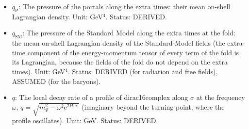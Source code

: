 \documentclass[
  10pt,
]{article}
\begin{document}
\begin{itemize}
  gas). Unit: GeV\(^4\). Status: DERIVED.
\item
  \(q_{\mathrm{P}}\): The pressure of the portals along the extra times:
  their mean on-shell Lagrangian density. Unit: GeV\(^4\). Status:
  DERIVED.
\item
  \(q_{\mathrm{SM}}\): The pressure of the Standard Model along the
  extra times at the fold: the mean on-shell Lagrangian density of the
  Standard-Model fields (the extra-time component of the energy-momentum
  tensor of every term of the fold is its Lagrangian, because the fields
  of the fold do not depend on the extra times). Unit: GeV\(^4\).
  Status: DERIVED (for radiation and free fields), ASSUMED (for the
  baryons).
\item
  \(q\): The local decay rate of a profile of dirac16complex along
  \(\sigma\) at the frequency \(\omega\),
  \(q = \sqrt{m_\Psi^2 - \omega^2\mathrm{e}^{2H\lvert\sigma\rvert}}\)
  (imaginary beyond the turning point, where the profile oscillates).
  Unit: GeV. Status: DERIVED.
\end{itemize}
\end{document}
